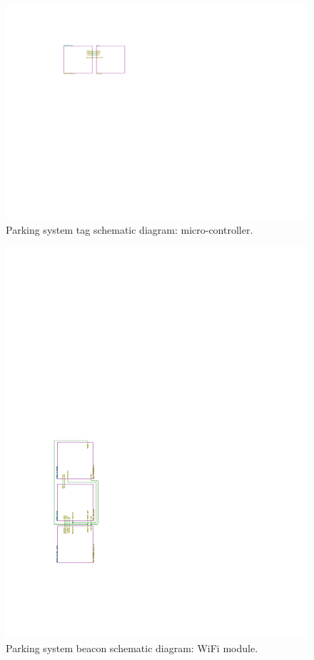 \begin{figure}[H]
\begin{center}
\includegraphics[page=3,scale=0.9,trim={10cm 8cm 10cm 5cm},clip]{data/parking-system.pdf}
\caption{Parking system tag schematic diagram: micro-controller.}
\end{center}
\end{figure}

\begin{figure}[H]
\begin{center}
\includegraphics[page=4,scale=1,trim={5cm 9cm 10cm 13cm},clip,angle=-90]{data/parking-system2.pdf}
\caption{Parking system beacon schematic diagram: WiFi module.}
\label{fig:wifi}
\end{center}
\end{figure}

